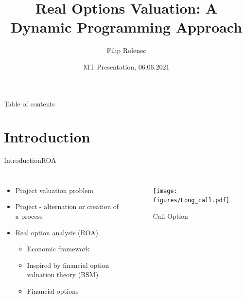 \documentclass[us]{beamer}
\title{Real Options Valuation: A Dynamic Programming Approach}
\author{Filip Rolenec}
\institute[CTU-FNSPE] %
{
  \inst{}%
  Czech technical university in Prague\\
  FNSPE \\
  Department of Mathematics
 
}
\date{MT Presentation, 06.06.2021}
\begin{document}
\begin{frame}
  \titlepage
\end{frame}

\begin{frame}{Table of contents}
  \tableofcontents
\end{frame}


\section{Introduction}


\begin{frame}{Introduction}{ROA}

	\begin{columns}
 		\begin{itemize}
 			\item {Project valuation problem}
 			\item {Project - alternation or creation of a process}
			\item {Real option analysis (ROA)}
			\begin{itemize}
				\item {Economic framework}
				\item{Inspired by financial option valuation theory (BSM)} 
				\item{Financial options}
			\end{itemize}
		\end{itemize}	
		\begin{figure}
			\texttt{[image: figures/Long\_call.pdf]}
			\caption{Call Option \cite{Inv:20}}
		\end{figure}
\end{columns}	

\end{frame}
\end{document}
